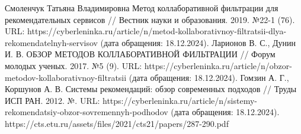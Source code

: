 \documentclass[bachelor, och, referat]{shiza}
\begin{document}
\begin{thebibliography}{3}
  Смоленчук Татьяна Владимировна Метод коллаборативной фильтрации для рекомендательных сервисов // Вестник науки и образования. 2019. №22-1 (76). URL: https://cyberleninka.ru/article/n/metod-kollaborativnoy-filtratsii-dlya-rekomendatelnyh-servisov (дата обращения: 18.12.2024).
  Ларионов В. С., Дунин И. В. ОБЗОР МЕТОДОВ КОЛЛАБОРАТИВНОЙ ФИЛЬТРАЦИИ // Форум молодых ученых. 2017. №5 (9). URL: https://cyberleninka.ru/article/n/obzor-metodov-kollaborativnoy-filtratsii (дата обращения: 18.12.2024). 
  Гомзин А. Г., Коршунов А. В. Системы рекомендаций: обзор современных подходов // Труды ИСП РАН. 2012. №. URL: https://cyberleninka.ru/article/n/sistemy-rekomendatsiy-obzor-sovremennyh-podhodov (дата обращения: 18.12.2024).
 https://cts.etu.ru/assets/files/2021/cts21/papers/287-290.pdf
\end{thebibliography}
\end{document}
